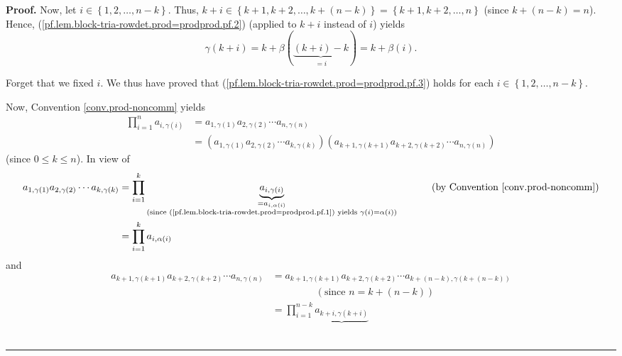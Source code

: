 \documentclass[numbers=enddot,12pt,final,onecolumn,notitlepage,english]{scrartcl}%
\theoremstyle{definition}
\newenvironment{proof}[1][Proof]{\noindent\textbf{#1.} }{\ \rule{0.5em}{0.5em}}
\let\prodnonlimits\prod
\renewcommand{\prod}{\prodnonlimits\limits}
\newenvironment{verlong}{}{}
\begin{document}
\begin{verlong}
\begin{proof}
Now, let $i\in\left\{  1,2,\ldots,n-k\right\}  $. Thus, $k+i\in\left\{
k+1,k+2,\ldots,k+\left(  n-k\right)  \right\}  =\left\{  k+1,k+2,\ldots
,n\right\}  $ (since $k+\left(  n-k\right)  =n$). Hence,
(\ref{pf.lem.block-tria-rowdet.prod=prodprod.pf.2}) (applied to $k+i$ instead
of $i$) yields
\begin{equation}
\gamma\left(  k+i\right)  =k+\beta\left(  \underbrace{\left(  k+i\right)
-k}_{=i}\right)  =k+\beta\left(  i\right)  .
\label{pf.lem.block-tria-rowdet.prod=prodprod.pf.3}%
\end{equation}


Forget that we fixed $i$. We thus have proved that
(\ref{pf.lem.block-tria-rowdet.prod=prodprod.pf.3}) holds for each
$i\in\left\{  1,2,\ldots,n-k\right\}  $.

Now, Convention \ref{conv.prod-noncomm} yields%
\begin{align*}
\prod_{i=1}^{n}a_{i,\gamma\left(  i\right)  }  &  =a_{1,\gamma\left(
1\right)  }a_{2,\gamma\left(  2\right)  }\cdots a_{n,\gamma\left(  n\right)
}\\
&  =\left(  a_{1,\gamma\left(  1\right)  }a_{2,\gamma\left(  2\right)  }\cdots
a_{k,\gamma\left(  k\right)  }\right)  \left(  a_{k+1,\gamma\left(
k+1\right)  }a_{k+2,\gamma\left(  k+2\right)  }\cdots a_{n,\gamma\left(
n\right)  }\right)
\end{align*}
(since $0\leq k\leq n$). In view of%
\begin{align*}
a_{1,\gamma\left(  1\right)  }a_{2,\gamma\left(  2\right)  }\cdots
a_{k,\gamma\left(  k\right)  }  &  =\prod_{i=1}^{k}\underbrace{a_{i,\gamma
\left(  i\right)  }}_{\substack{=a_{i,\alpha\left(  i\right)  }\\\text{(since
(\ref{pf.lem.block-tria-rowdet.prod=prodprod.pf.1}) yields }\gamma\left(
i\right)  =\alpha\left(  i\right)  \text{)}}}\ \ \ \ \ \ \ \ \ \ \left(
\text{by Convention \ref{conv.prod-noncomm}}\right) \\
&  =\prod_{i=1}^{k}a_{i,\alpha\left(  i\right)  }%
\end{align*}
and%
\begin{align*}
a_{k+1,\gamma\left(  k+1\right)  }a_{k+2,\gamma\left(  k+2\right)  }\cdots
a_{n,\gamma\left(  n\right)  }  &  =a_{k+1,\gamma\left(  k+1\right)
}a_{k+2,\gamma\left(  k+2\right)  }\cdots a_{k+\left(  n-k\right)
,\gamma\left(  k+\left(  n-k\right)  \right)  }\\
&  \ \ \ \ \ \ \ \ \ \ \ \ \ \ \ \ \ \ \ \ \left(  \text{since }n=k+\left(
n-k\right)  \right) \\
&  =\prod_{i=1}^{n-k}\underbrace{a_{k+i,\gamma\left(  k+i\right)  }%
}
\end{align*}
\end{proof}
\end{verlong}
\end{document}
